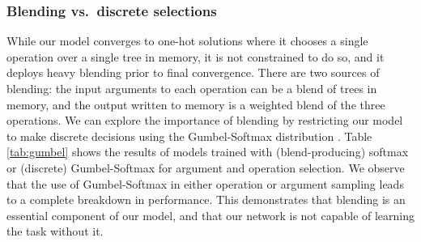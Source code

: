 \begin{table}[t]
\begin{center}
\begin{sc}
\end{sc}
\end{center}
\vskip -0.1in
\caption{Accuracy on Active$\leftrightarrow$Logical across five random initializations for models with predefined \car, \cdr\ and \cons\ operations versus learned transformations. Lexical and structural are test OOD splits.}
\label{tab:predefined}
\end{table}

\subsubsection{Blending vs.\ discrete selections}
While our model converges to one-hot solutions where it chooses a single operation over a single tree in memory, it is not constrained to do so, and it deploys heavy blending prior to final convergence. There are two sources of blending: the input arguments to each operation can be a blend of trees in memory, and the output written to memory is a weighted blend of the three operations. We can explore the importance of blending by restricting our model to make discrete decisions using the Gumbel-Softmax distribution \cite{jang2017categorical,maddison2017the}. Table \ref{tab:gumbel} shows the results of models trained with (blend-producing) softmax or (discrete) Gumbel-Softmax for argument and operation selection. We observe that the use of Gumbel-Softmax in either operation or argument sampling leads to a complete breakdown in performance. This demonstrates that blending is an essential component of our model, and that our network is not capable of learning the task without it.

